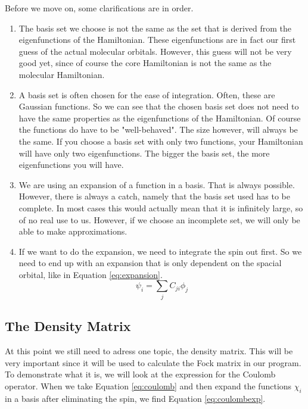 Before we move on, some clarifications are in order. 
\begin{enumerate}
    \item The basis set we choose is not the same as the set that is derived
    from the eigenfunctions of the Hamiltonian. These eigenfunctions are in fact
    our first guess of the actual molecular orbitals. However, this guess will not be
    very good yet, since of course the core Hamiltonian is not the same as the 
    molecular Hamiltonian. 
    \item A basis set is often chosen for the ease of integration. Often, these
    are Gaussian functions. So we can see that the chosen basis set does not
    need to have the same properties as the eigenfunctions of the Hamiltonian. 
    Of course the functions do have to be "well-behaved". The size however, will always be the same.
    If you choose a basis set with only two functions, your Hamiltonian will have only
    two eigenfunctions. The bigger the basis set, the more eigenfunctions you will have. 
    \item We are using an expansion of a function in a basis. That is always possible.
    However, there is always a catch, namely that the basis set used has to be complete.
    In most cases this would actually mean that it is infinitely large, so of no
    real use to us. However, if we choose an incomplete set, we will only be able
    to make approximations.
    \item If we want to do the expansion, we need to integrate the spin out first.
    So we need to end up with an expansion that is only dependent on the spacial
    orbital, like in Equation \ref{eq:expansion}.
    \begin{equation}\label{eq:expansion}
        \psi_i = \sum_jC_{ji}\phi_j
    \end{equation}
\end{enumerate}

\subsection{The Density Matrix}
\label{subsec:theDM}
At this point we still need to adress one topic, the density matrix. This will be
very important since it will be used to calculate the Fock matrix in our program.
To demonstrate what it is, we will look at the expression for the Coulomb operator.
When we take Equation \ref{eq:coulomb} and then expand the functions $\chi_i$ in
a basis after eliminating the spin, we find Equation \ref{eq:coulombexp}.

